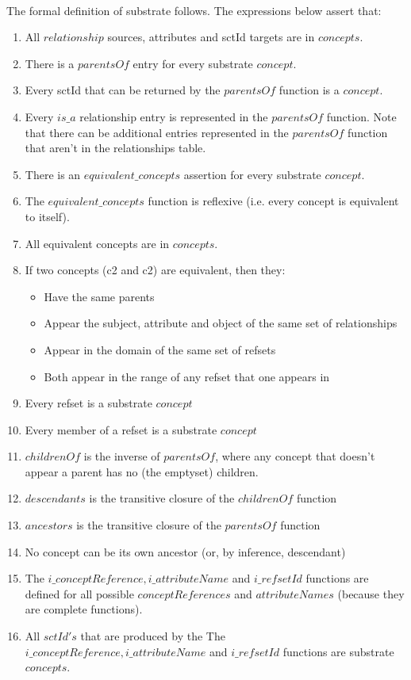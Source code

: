 \documentclass{article}
\begin{document}
\paragraph{}
The formal definition of substrate follows. The expressions below assert that:
\begin{enumerate}
\item All $relationship$ sources, attributes and sctId targets are in $concepts$.
\item There is a $parentsOf$ entry for every substrate $concept$.
\item Every sctId that can be returned by the $parentsOf$ function is a $concept$.
\item Every $is\_a$ relationship entry is represented in the $parentsOf$ function. Note that there can be additional entries represented in the $parentsOf$ function that aren't in the relationships table.
\item There is an $equivalent\_concepts$ assertion for every substrate $concept$.
\item The $equivalent\_concepts$ function is reflexive (i.e. every concept is equivalent to itself).
\item All equivalent concepts are in $concepts$.
\item If two concepts (c2 and c2) are equivalent, then they:
\begin{itemize}[noitemsep,nolistsep]
\item Have the same parents
\item Appear the subject, attribute and object of the same set of relationships
\item Appear in the domain of the same set of refsets
\item Both appear in the range of any refset that one appears in
\end{itemize}
\item Every refset is a substrate $concept$
\item Every member of a refset is a substrate $concept$
\item $childrenOf$ is the inverse of $parentsOf$, where any concept that doesn't appear a parent has no (the emptyset) children.
\item $descendants$ is the transitive closure of the $childrenOf$ function
\item $ancestors$ is the transitive closure of the $parentsOf$ function
\item No concept can be its own ancestor (or, by inference, descendant)
\item The $i\_conceptReference, i\_attributeName$ and $i\_refsetId$ functions are defined for all possible $conceptReferences$ and $attributeNames$ (because they are complete functions).
\item All $sctId's$ that are produced by the The $i\_conceptReference, i\_attributeName$ and $i\_refsetId$ functions are substrate $concepts$.
\end{enumerate}
\end{document}
